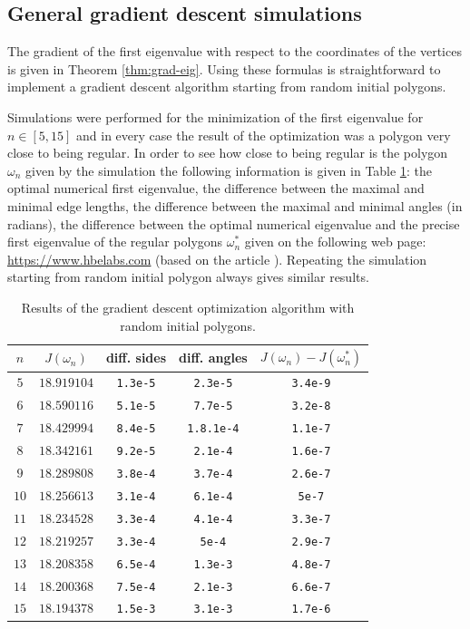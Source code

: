 \documentclass[11pt]{article}
\newcommand{\smaller}{\small}
\numberwithin{equation}{section}\newtheorem*{jepEnonce}{\jepEnonceTitle}\newenvironment{enonce*}[1]{\def\jepEnonceTitle{#1}\jepEnonce}{\endjepEnonce}\newtheorem*{conj*}{Conjecture}
\theoremstyle{plain}
\theoremstyle{definition}
\begin{document}
\subsection{General gradient descent simulations}

The gradient of the first eigenvalue with respect to the coordinates of the vertices is given in Theorem \ref{thm:grad-eig}. Using these formulas is straightforward to implement a gradient descent algorithm starting from random initial polygons.

Simulations were performed for the minimization of the first eigenvalue for $n \in [5,15]$ and in every case the result of the optimization was a polygon very close to being regular. In order to see how close to being regular is the polygon $\omega_n$ given by the simulation the following information is given in Table \ref{tab:result-optim}: the optimal numerical first eigenvalue, the difference between the maximal and minimal edge lengths, the difference between the maximal and minimal angles (in radians), the difference between the optimal numerical eigenvalue and the precise first eigenvalue of the regular polygons $\omega_n^*$ given on the following web page: \url{https://www.hbelabs.com} (based on the article \cite{Jo17}). Repeating the simulation starting from random initial polygon always gives similar results.
\begin{table}[htb]
\smaller
\caption{Results of the gradient descent optimization algorithm with random initial polygons.}
\label{tab:result-optim}
\centering
\begin{tabular}{|c|c|c|c|c|}
\hline
$n$ & $J(\omega_n)$ & diff. sides & diff. angles & $J(\omega_n)-J(\omega_n^*)$ \\ \hline
$5$ & $18.919104$ & \texttt{1.3e-5} & \texttt{2.3e-5} & \texttt{3.4e-9} \\ \hline
$6$ & $18.590116$ & \texttt{5.1e-5} & \texttt{7.7e-5} & \texttt{3.2e-8} \\ \hline
$7$ & $18.429994$ & \texttt{8.4e-5} & \texttt{1.8.1e-4}& \texttt{1.1e-7} \\ \hline
$8$ & $18.342161$ & \texttt{9.2e-5} & \texttt{2.1e-4}& \texttt{1.6e-7} \\ \hline
$9$ & $18.289808$ & \texttt{3.8e-4} & \texttt{3.7e-4} & \texttt{2.6e-7} \\ \hline
$10$ & $18.256613$ & \texttt{3.1e-4} & \texttt{6.1e-4} & \texttt{5e-7} \\ \hline
$11$ & $18.234528$ & \texttt{3.3e-4} & \texttt{4.1e-4} & \texttt{3.3e-7} \\ \hline
$12$ & $18.219257$ & \texttt{3.3e-4} & \texttt{5e-4} & \texttt{2.9e-7} \\ \hline
$13$ & $18.208358$ & \texttt{6.5e-4} & \texttt{1.3e-3} & \texttt{4.8e-7} \\ \hline
$14$ & $18.200368$ & \texttt{7.5e-4} & \texttt{2.1e-3} & \texttt{6.6e-7} \\ \hline
$15$ & $18.194378$ & \texttt{1.5e-3} & \texttt{3.1e-3} & \texttt{1.7e-6} \\ \hline
\end{tabular}
\end{table}
\end{document}
